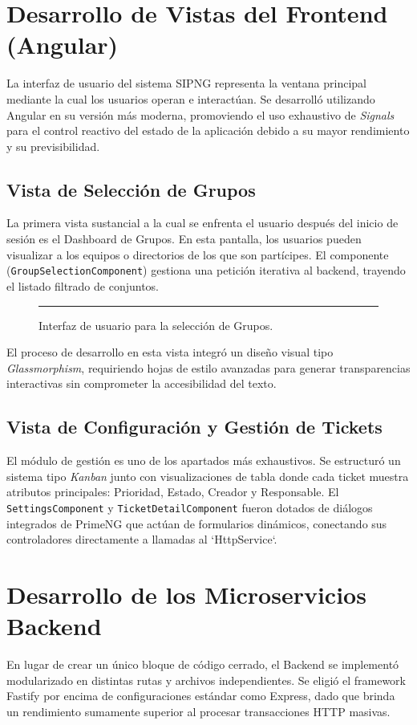 \documentclass[12pt,a4paper]{report}
\begin{document}
\section{Desarrollo de Vistas del Frontend (Angular)}
La interfaz de usuario del sistema SIPNG representa la ventana principal mediante la cual los usuarios operan e interactúan. Se desarrolló utilizando Angular en su versión más moderna, promoviendo el uso exhaustivo de \textit{Signals} para el control reactivo del estado de la aplicación debido a su mayor rendimiento y su previsibilidad.

\subsection{Vista de Selección de Grupos}
La primera vista sustancial a la cual se enfrenta el usuario después del inicio de sesión es el Dashboard de Grupos. En esta pantalla, los usuarios pueden visualizar a los equipos o directorios de los que son partícipes. El componente (\texttt{GroupSelectionComponent}) gestiona una petición iterativa al backend, trayendo el listado filtrado de conjuntos. 

\begin{figure}[H]
    \centering
    \rule{10cm}{5cm} %
    \caption{Interfaz de usuario para la selección de Grupos.}
\end{figure}

El proceso de desarrollo en esta vista integró un diseño visual tipo \textit{Glassmorphism}, requiriendo hojas de estilo avanzadas para generar transparencias interactivas sin comprometer la accesibilidad del texto.

\subsection{Vista de Configuración y Gestión de Tickets}
El módulo de gestión es uno de los apartados más exhaustivos. Se estructuró un sistema tipo \textit{Kanban} junto con visualizaciones de tabla donde cada ticket muestra atributos principales: Prioridad, Estado, Creador y Responsable. El \texttt{SettingsComponent} y \texttt{TicketDetailComponent} fueron dotados de diálogos integrados de PrimeNG que actúan de formularios dinámicos, conectando sus controladores directamente a llamadas al `HttpService`.

\section{Desarrollo de los Microservicios Backend}
En lugar de crear un único bloque de código cerrado, el Backend se implementó modularizado en distintas rutas y archivos independientes. Se eligió el framework Fastify por encima de configuraciones estándar como Express, dado que brinda un rendimiento sumamente superior al procesar transacciones HTTP masivas.
\end{document}

